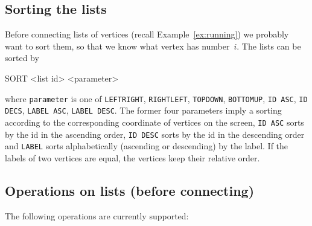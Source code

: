 \subsection{Sorting the lists}

Before connecting lists of vertices (recall Example~\ref{ex:running})
we probably want to sort them, so that we know what vertex has
number~$i$. The lists can be sorted by

\begin{tcolorbox}[colback=lightpink]
  SORT <list id> <parameter>
\end{tcolorbox}%
where \texttt{parameter} is one of \texttt{LEFTRIGHT},
\texttt{RIGHTLEFT}, \texttt{TOPDOWN}, \texttt{BOTTOMUP}, \texttt{ID
  ASC}, \texttt{ID DECS}, \texttt{LABEL ASC}, \texttt{LABEL DESC}. The
former four parameters imply a sorting according to the corresponding
coordinate of vertices on the screen, \texttt{ID ASC} sorts by the id
in  the ascending order, \texttt{ID DESC} sorts by the id
in  the descending order and \texttt{LABEL} sorts alphabetically
(ascending or descending) by the label. If the labels of two vertices
are equal, the vertices keep their relative order.

\subsection{Operations on lists (before connecting)}

The following operations are currently supported:

